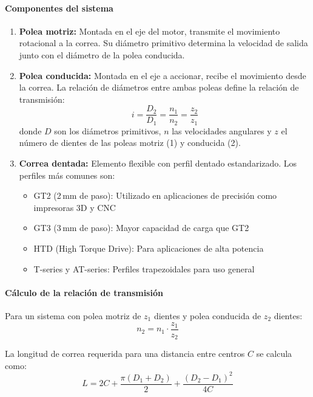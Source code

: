 \paragraph{Componentes del sistema}
\begin{enumerate}
    \item \textbf{Polea motriz:} Montada en el eje del motor, transmite el movimiento rotacional a la correa. Su diámetro primitivo determina la velocidad de salida junto con el diámetro de la polea conducida.

    \item \textbf{Polea conducida:} Montada en el eje a accionar, recibe el movimiento desde la correa. La relación de diámetros entre ambas poleas define la relación de transmisión:
    \begin{equation}
        i = \frac{D_2}{D_1} = \frac{n_1}{n_2} = \frac{z_2}{z_1}
    \end{equation}
    donde $D$ son los diámetros primitivos, $n$ las velocidades angulares y $z$ el número de dientes de las poleas motriz (1) y conducida (2).

    \item \textbf{Correa dentada:} Elemento flexible con perfil dentado estandarizado. Los perfiles más comunes son:
    \begin{itemize}
        \item GT2 (2\,mm de paso): Utilizado en aplicaciones de precisión como impresoras 3D y CNC
        \item GT3 (3\,mm de paso): Mayor capacidad de carga que GT2
        \item HTD (High Torque Drive): Para aplicaciones de alta potencia
        \item T-series y AT-series: Perfiles trapezoidales para uso general
    \end{itemize}
\end{enumerate}

\paragraph{Cálculo de la relación de transmisión}
Para un sistema con polea motriz de $z_1$ dientes y polea conducida de $z_2$ dientes:
\begin{equation}
    n_2 = n_1 \cdot \frac{z_1}{z_2}
\end{equation}

La longitud de correa requerida para una distancia entre centros $C$ se calcula como:
\begin{equation}
    L = 2C + \frac{\pi(D_1 + D_2)}{2} + \frac{(D_2 - D_1)^2}{4C}
\end{equation}

